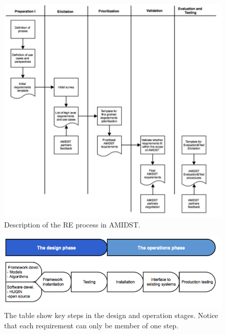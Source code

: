 \documentclass[11pt, oneside]{article}   	%
\begin{document}
\begin{figure}
\centering
\includegraphics [keepaspectratio,width = 14cm] {REprocess1}
\caption{Description of the RE process in AMIDST.}
\label{REprocess1}
\end{figure}


\begin{figure}
\centering
\includegraphics [keepaspectratio,width = 14cm] {REprocess2}
\caption{The table show key steps in the design and operation stages. Notice that each requirement can only be member of one step.}
\label{REprocess2}
\end{figure}
\end{document}
